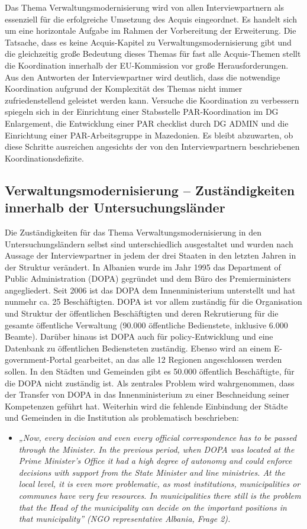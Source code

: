 Das Thema Verwaltungsmodernisierung wird von allen Interviewpartnern als essenziell für die erfolgreiche Umsetzung des Acquis eingeordnet. Es handelt sich um eine horizontale Aufgabe im Rahmen der Vorbereitung der Erweiterung. Die Tatsache, dass es keine Acquis-Kapitel zu Verwaltungsmodernisierung gibt und die gleichzeitig große Bedeutung dieses Themas für fast alle Acquis-Themen stellt die Koordination innerhalb der EU-Kommission vor große Herausforderungen. Aus den Antworten der Interviewpartner wird deutlich, dass die notwendige Koordination aufgrund der Komplexität des Themas nicht immer zufriedenstellend geleistet werden kann. Versuche die Koordination zu verbessern spiegeln sich in der Einrichtung einer Stabsstelle PAR-Koordination im DG Enlargement, die Entwicklung einer PAR checklist durch DG ADMIN und die Einrichtung einer PAR-Arbeitsgruppe in Mazedonien. Es bleibt abzuwarten, ob diese Schritte ausreichen angesichts der von den Interviewpartnern beschriebenen Koordinationsdefizite.
\subsection{Verwaltungsmodernisierung – Zuständigkeiten innerhalb der Untersuchungsländer }
Die Zuständigkeiten für das Thema Verwaltungsmodernisierung in den Untersuchungsländern selbst sind unterschiedlich ausgestaltet und wurden nach Aussage der Interviewpartner in jedem der drei Staaten in den letzten Jahren in der Struktur verändert. In Albanien wurde im Jahr 1995 das Department of Public Administration (DOPA) gegründet und dem Büro des Premierministers angegliedert. Seit 2006 ist das DOPA dem Innenministerium unterstellt und hat nunmehr ca. 25 Beschäftigten. DOPA ist vor allem zuständig für die Organisation und Struktur der öffentlichen Beschäftigten und deren Rekrutierung für die gesamte öffentliche Verwaltung (90.000 öffentliche Bedienstete, inklusive 6.000 Beamte). Darüber hinaus ist DOPA auch für policy-Entwicklung und eine Datenbank zu öffentlichen Bediensteten zuständig. Ebenso wird an einem E-government-Portal gearbeitet, an das alle 12 Regionen angeschlossen werden sollen. In den Städten und Gemeinden gibt es 50.000 öffentlich Beschäftigte, für die DOPA nicht zuständig ist. Als zentrales Problem wird wahrgenommen, dass der Transfer von DOPA in das Innenministerium zu einer Beschneidung seiner Kompetenzen geführt hat. Weiterhin wird die fehlende Einbindung der Städte und Gemeinden in die Institution als problematisch beschrieben:
\begin{itemize}[label={}]
\item \textit{„Now, every decision and even every official correspondence has to be passed through the Minister. In the previous period, when DOPA was located at the Prime Minister’s Office it had a high degree of autonomy and could enforce decisions with support from the State Minister and line ministries. At the local level, it is even more problematic, as most institutions, municipalities or communes have very few resources. In municipalities there still is the problem that the Head of the municipality can decide on the important positions in that municipality” (NGO representative Albania, Frage 2).}
\end{itemize}

